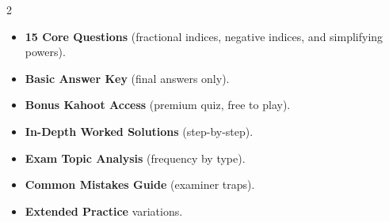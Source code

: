 \documentclass[11pt,a4paper]{article}
\newcommand{\FullReleaseDate}{April 30, 2026}
\begin{document}
\vspace{8pt}

\begin{multicols}{2}
  \begin{tcolorbox}[card, title=\sffamily\bfseries\textcolor{white}{\faHandPointDown\ TODAY (Simplified Version)}, colbacktitle=mainblue, boxed title style={sharp corners, boxrule=0pt}]
    \begin{itemize}[leftmargin=1.2em, itemsep=2pt]
      \item \small \textbf{15 Core Questions} (fractional indices, negative indices, and simplifying powers).
      \item \small \textbf{Basic Answer Key} (final answers only).
      \item \small \textbf{Bonus Kahoot Access} (premium quiz, free to play).
    \end{itemize}
  \end{tcolorbox}

  \columnbreak

  \begin{tcolorbox}[card, title=\sffamily\bfseries\textcolor{white}{\faRocket\ ON \FullReleaseDate\ (Full Upgrade)}, colbacktitle=mainblue, boxed title style={sharp corners, boxrule=0pt}]
    \begin{itemize}[leftmargin=1.2em, itemsep=2pt]
      \item \small \textbf{In-Depth Worked Solutions} (step-by-step).
      \item \small \textbf{Exam Topic Analysis} (frequency by type).
      \item \small \textbf{Common Mistakes Guide} (examiner traps).
      \item \small \textbf{Extended Practice} variations.
    \end{itemize}
  \end{tcolorbox}
\end{multicols}
\end{document}
